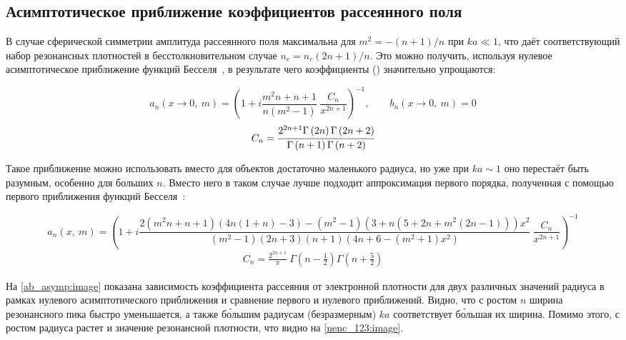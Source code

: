 \subsection{Асимптотическое приближение коэффициентов рассеянного поля}

В случае сферической симметрии амплитуда рассеянного поля максимальна для $m^2 = - (n+ 1) / n$ при $ka \ll 1$, что даёт соответствующий набор резонансных плотностей в бесстолкновительном случае $n_e = n_c(2n + 1) / n$. Это можно получить, используя нулевое асимптотическое приближение функций Бесселя~\cite{boren_huffman}, в результате чего коэффициенты () значительно упрощаются:

    \begin{equation}
        a_n\left( x \to 0,\:m \right) = {\left( 1 + i \frac{m^2n + n + 1 }{n \left( m^2 - 1 \right)} \: \frac{C_n}{x^{2n + 1}}\right)}^{-1}, \qquad b_n\left( x \to 0,\:m \right) = 0
        \label{ab_asymp}
    \end{equation}
    \begin{align*}
		C_n = \cfrac{2^{2n + 1}\Gamma \left(2n \right) \Gamma \left(2n + 2\right)}{\Gamma \left(n + 1\right) \Gamma \left(n + 2\right)}
    \end{align*}

Такое приближение можно использовать вместо  для объектов достаточно маленького радиуса, но уже при $ka \sim 1$ оно перестаёт быть разумным, особенно для больших $n$. Вместо него в таком случае лучше подходит аппроксимация первого порядка, полученная с помощью первого приближения функций Бесселя~\cite{boren_huffman}:

    \begin{equation}
		a_n\left( x ,\:m \right) = {\left( 1 + i \frac{ 2(m^2 n + n + 1) (4n (1 + n) - 3) - (m^2 - 1)(3 + n(5 + 2n + m^2 (2n - 1))) x^2}{ (m^2 - 1)(2n + 3)(n + 1)(4n + 6 - (m^2 + 1)x^2)} \: \frac{C_n}{x^{2n + 1}}\right) }^{-1}
		\label{an_sph_asymp1}
    \end{equation}
	\begin{align*}
		C_n = \frac{2^{2n + 1}}{\pi}\:\Gamma \left(n - \frac{1}{2} \right) \Gamma \left(n + \frac{5}{2} \right)
    \end{align*}

На \autoref{ab_asymp:image} показана зависимость коэффициента рассеяния от электронной плотности для двух различных значений радиуса в рамках нулевого асимптотического приближения и сравнение первого и нулевого приближений. Видно, что с ростом $n$ ширина резонансного пика быстро уменьшается, а также б\'{о}льшим радиусам (безразмерным) $ka$ соответствует б\'{о}льшая их ширина. Помимо этого, с ростом радиуса растет и значение резонансной плотности, что видно на \autoref{nenc_123:image}.

